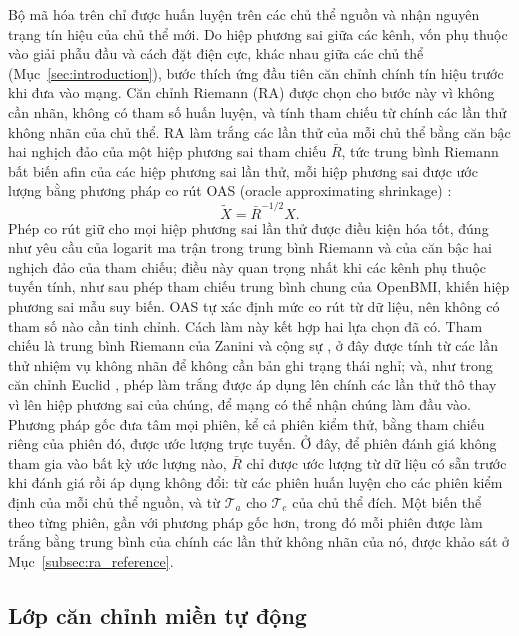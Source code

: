 \documentclass[preprint,12pt]{elsarticle}
\begin{document}
Bộ mã hóa trên chỉ được huấn luyện trên các chủ thể nguồn và nhận nguyên trạng tín hiệu của chủ thể mới. Do hiệp phương sai giữa các kênh, vốn phụ thuộc vào giải phẫu đầu và cách đặt điện cực, khác nhau giữa các chủ thể (Mục~\ref{sec:introduction}), bước thích ứng đầu tiên căn chỉnh chính tín hiệu trước khi đưa vào mạng. Căn chỉnh Riemann (RA) được chọn cho bước này vì không cần nhãn, không có tham số huấn luyện, và tính tham chiếu từ chính các lần thử không nhãn của chủ thể. RA làm trắng các lần thử của mỗi chủ thể bằng căn bậc hai nghịch đảo của một hiệp phương sai tham chiếu $\bar{R}$, tức trung bình Riemann bất biến afin của các hiệp phương sai lần thử, mỗi hiệp phương sai được ước lượng bằng phương pháp co rút OAS (oracle approximating shrinkage) \cite{chen2010oas}:
\begin{equation}
    \widetilde{X}=\bar{R}^{-1/2}X.
\end{equation}
Phép co rút giữ cho mọi hiệp phương sai lần thử được điều kiện hóa tốt, đúng như yêu cầu của logarit ma trận trong trung bình Riemann và của căn bậc hai nghịch đảo của tham chiếu; điều này quan trọng nhất khi các kênh phụ thuộc tuyến tính, như sau phép tham chiếu trung bình chung của OpenBMI, khiến hiệp phương sai mẫu suy biến. OAS tự xác định mức co rút từ dữ liệu, nên không có tham số nào cần tinh chỉnh. Cách làm này kết hợp hai lựa chọn đã có. Tham chiếu là trung bình Riemann của Zanini và cộng sự \cite{zanini2018riemannian}, ở đây được tính từ các lần thử nhiệm vụ không nhãn để không cần bản ghi trạng thái nghỉ; và, như trong căn chỉnh Euclid \cite{he2020euclidean}, phép làm trắng được áp dụng lên chính các lần thử thô thay vì lên hiệp phương sai của chúng, để mạng có thể nhận chúng làm đầu vào. Phương pháp gốc đưa tâm mọi phiên, kể cả phiên kiểm thử, bằng tham chiếu riêng của phiên đó, được ước lượng trực tuyến. Ở đây, để phiên đánh giá không tham gia vào bất kỳ ước lượng nào, $\bar{R}$ chỉ được ước lượng từ dữ liệu có sẵn trước khi đánh giá rồi áp dụng không đổi: từ các phiên huấn luyện cho các phiên kiểm định của mỗi chủ thể nguồn, và từ $\mathcal{T}_a$ cho $\mathcal{T}_e$ của chủ thể đích. Một biến thể theo từng phiên, gần với phương pháp gốc hơn, trong đó mỗi phiên được làm trắng bằng trung bình của chính các lần thử không nhãn của nó, được khảo sát ở Mục~\ref{subsec:ra_reference}.

\subsection{Lớp căn chỉnh miền tự động}
\label{subsec:autodial}
\end{document}

